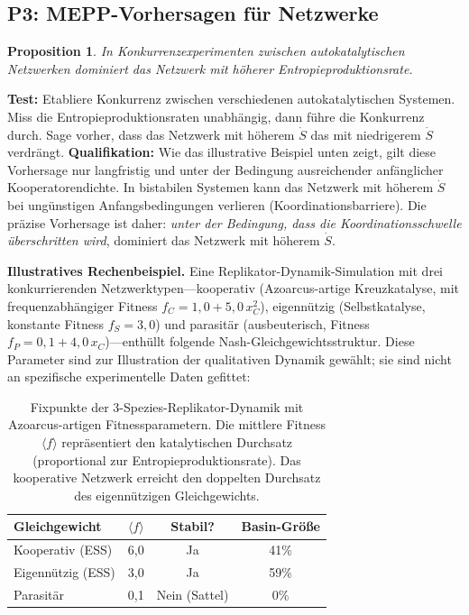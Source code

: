 \documentclass[12pt,a4paper]{article}
\newtheorem{proposition}{Proposition}
\theoremstyle{remark}
\begin{document}
\subsection{P3: MEPP-Vorhersagen f\"ur Netzwerke}

\begin{proposition}
In Konkurrenzexperimenten zwischen autokatalytischen Netzwerken dominiert das Netzwerk mit h\"oherer Entropieproduktionsrate.
\end{proposition}

\textbf{Test:} Etabliere Konkurrenz zwischen verschiedenen autokatalytischen Systemen. Miss die Entropieproduktionsraten unabh\"angig, dann f\"uhre die Konkurrenz durch. Sage vorher, dass das Netzwerk mit h\"oherem $\dot{S}$ das mit niedrigerem $\dot{S}$ verdr\"angt. \textbf{Qualifikation:} Wie das illustrative Beispiel unten zeigt, gilt diese Vorhersage nur langfristig und unter der Bedingung ausreichender anf\"anglicher Kooperatorendichte. In bistabilen Systemen kann das Netzwerk mit h\"oherem $\dot{S}$ bei ung\"unstigen Anfangsbedingungen verlieren (Koordinationsbarriere). Die pr\"azise Vorhersage ist daher: \emph{unter der Bedingung, dass die Koordinationsschwelle \"uberschritten wird}, dominiert das Netzwerk mit h\"oherem $\dot{S}$.

\textbf{Illustratives Rechenbeispiel.} Eine Replikator-Dynamik-Simulation mit drei konkurrierenden Netzwerktypen---kooperativ (Azoarcus-artige Kreuzkatalyse, mit frequenzabh\"angiger Fitness $f_C = 1{,}0 + 5{,}0\,x_C^2$), eigenn\"utzig (Selbstkatalyse, konstante Fitness $f_S = 3{,}0$) und parasit\"ar (ausbeuterisch, Fitness $f_P = 0{,}1 + 4{,}0\,x_C$)---enth\"ullt folgende Nash-Gleichgewichtsstruktur. Diese Parameter sind zur Illustration der qualitativen Dynamik gew\"ahlt; sie sind nicht an spezifische experimentelle Daten gefittet:

\begin{table}[ht]
\centering
\caption{Fixpunkte der 3-Spezies-Replikator-Dynamik mit Azoarcus-artigen Fitnessparametern. Die mittlere Fitness $\langle f \rangle$ repr\"asentiert den katalytischen Durchsatz (proportional zur Entropieproduktionsrate). Das kooperative Netzwerk erreicht den doppelten Durchsatz des eigenn\"utzigen Gleichgewichts.}
\label{tab:replicator-fps}
\begin{tabular}{lccc}
\toprule
\textbf{Gleichgewicht} & $\langle f \rangle$ & \textbf{Stabil?} & \textbf{Basin-Gr\"o\ss{}e} \\
\midrule
Kooperativ (ESS) & 6{,}0 & Ja & 41\% \\
Eigenn\"utzig (ESS) & 3{,}0 & Ja & 59\% \\
Parasit\"ar & 0{,}1 & Nein (Sattel) & 0\% \\
\bottomrule
\end{tabular}
\end{table}
\end{document}
